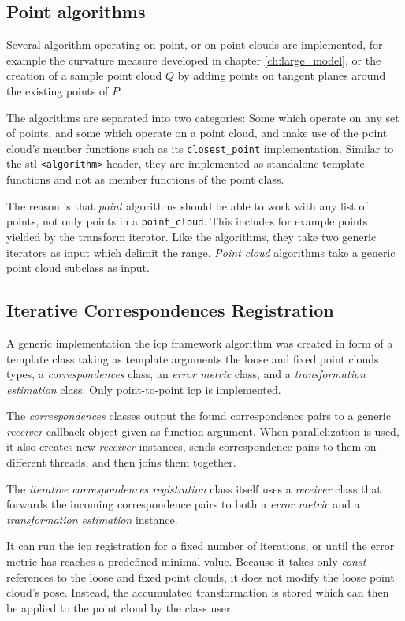 \subsection{Point algorithms}
Several algorithm operating on point, or on point clouds are implemented, for example the curvature measure developed in chapter \ref{ch:large_model}, or the creation of a sample point cloud $Q$ by adding points on tangent planes around the existing points of $P$.

The algorithms are separated into two categories: Some which operate on any set of points, and some which operate on a point cloud, and make use of the point cloud's member functions such as its \verb&closest_point& implementation. Similar to the \gls{stl} \verb&<algorithm>& header, they are implemented as standalone template functions and not as member functions of the point class. 

The reason is that \emph{point} algorithms should be able to work with any list of points, not only points in a \verb&point_cloud&. This includes for example points yielded by the transform iterator. Like the  algorithms, they take two generic iterators as input which delimit the range. \emph{Point cloud} algorithms take a generic point cloud subclass as input.


\subsection{Iterative Correspondences Registration}
A generic implementation the \gls{icp} framework algorithm was created in form of a template class taking as template arguments the loose and fixed point clouds types, a \emph{correspondences} class, an \emph{error metric} class, and a \emph{transformation estimation} class. Only point-to-point \gls{icp} is implemented.

The \emph{correspondences} classes output the found correspondence pairs to a generic \emph{receiver} callback object given as function argument. When parallelization is used, it also creates new \emph{receiver} instances, sends correspondence pairs to them on different threads, and then joins them together.

The \emph{iterative correspondences registration} class itself uses a \emph{receiver} class that forwards the incoming correspondence pairs to both a \emph{error metric} and a \emph{transformation estimation} instance.

It can run the \gls{icp} registration for a fixed number of iterations, or until the error metric has reaches a predefined minimal value. Because it takes only \emph{const} references to the loose and fixed point clouds, it does not modify the loose point cloud's pose. Instead, the accumulated transformation is stored which can then be applied to the point cloud by the class user.

